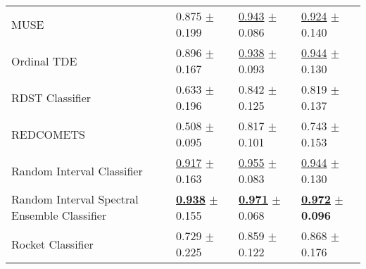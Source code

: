 \begin{tabular}{llll}
MUSE & \textcolor[rgb]{0.1380753138,0.5000000000,0}{0.875} $\pm$ \textcolor[rgb]{0.7390823473,0.2609176527,0}{0.199} & \underline{\textcolor[rgb]{0.1706161137,0.5000000000,0}{0.943}} $\pm$ \textcolor[rgb]{0.2209016468,0.5000000000,0}{0.086} & \underline{\textcolor[rgb]{0.1944444444,0.5000000000,0}{0.924}} $\pm$ \textcolor[rgb]{0.4049258024,0.5000000000,0}{0.140} \\
Ordinal TDE & \textcolor[rgb]{0.0920502092,0.5000000000,0}{0.896} $\pm$ \textcolor[rgb]{0.5790995120,0.4209004880,0}{0.167} & \underline{\textcolor[rgb]{0.1990521327,0.5000000000,0}{0.938}} $\pm$ \textcolor[rgb]{0.2953042690,0.5000000000,0}{0.093} & \underline{\textcolor[rgb]{0.1111111111,0.5000000000,0}{0.944}} $\pm$ \textcolor[rgb]{0.3121982484,0.5000000000,0}{0.130} \\
RDST Classifier & \textcolor[rgb]{0.6719665272,0.3280334728,0}{0.633} $\pm$ \textcolor[rgb]{0.7210386498,0.2789613502,0}{0.196} & \textcolor[rgb]{0.7748815166,0.2251184834,0}{0.842} $\pm$ \textcolor[rgb]{0.6660804012,0.3339195988,0}{0.125} & \textcolor[rgb]{0.6111111111,0.3888888889,0}{0.819} $\pm$ \textcolor[rgb]{0.3783535423,0.5000000000,0}{0.137} \\
REDCOMETS & \textcolor[rgb]{0.9497907950,0.0502092050,0}{0.508} $\pm$ \textcolor[rgb]{0.2201204470,0.5000000000,0}{0.095} & \textcolor[rgb]{0.9241706161,0.0758293839,0}{0.817} $\pm$ \textcolor[rgb]{0.3941798975,0.5000000000,0}{0.101} & \textcolor[rgb]{0.9166666667,0.0833333333,0}{0.743} $\pm$ \textcolor[rgb]{0.5255758785,0.4744241215,0}{0.153} \\
Random Interval Classifier & \underline{\textcolor[rgb]{0.0460251046,0.5000000000,0}{0.917}} $\pm$ \textcolor[rgb]{0.5577723962,0.4422276038,0}{0.163} & \underline{\textcolor[rgb]{0.0995260664,0.5000000000,0}{0.955}} $\pm$ \textcolor[rgb]{0.1853514393,0.5000000000,0}{0.083} & \underline{\textcolor[rgb]{0.1111111111,0.5000000000,0}{0.944}} $\pm$ \textcolor[rgb]{0.3121982484,0.5000000000,0}{0.130} \\
Random Interval Spectral Ensemble Classifier & \underline{\textbf{\textcolor[rgb]{0.0000000000,0.5000000000,0}{0.938}}} $\pm$ \textcolor[rgb]{0.5209154293,0.4790845707,0}{0.155} & \underline{\textbf{\textcolor[rgb]{0.0000000000,0.5000000000,0}{0.971}}} $\pm$ \textcolor[rgb]{0.0113491881,0.5000000000,0}{0.068} & \underline{\textbf{\textcolor[rgb]{0.0000000000,0.5000000000,0}{0.972}}} $\pm$ \textbf{\textcolor[rgb]{0.0000000000,0.5000000000,0}{0.096}} \\
Rocket Classifier & \textcolor[rgb]{0.4602510460,0.5000000000,0}{0.729} $\pm$ \textcolor[rgb]{0.8661764807,0.1338235193,0}{0.225} & \textcolor[rgb]{0.6729857820,0.3270142180,0}{0.859} $\pm$ \textcolor[rgb]{0.6321445607,0.3678554393,0}{0.122} & \textcolor[rgb]{0.4166666667,0.5000000000,0}{0.868} $\pm$ \textcolor[rgb]{0.7404054892,0.2595945108,0}{0.176} \\

\end{tabular}
